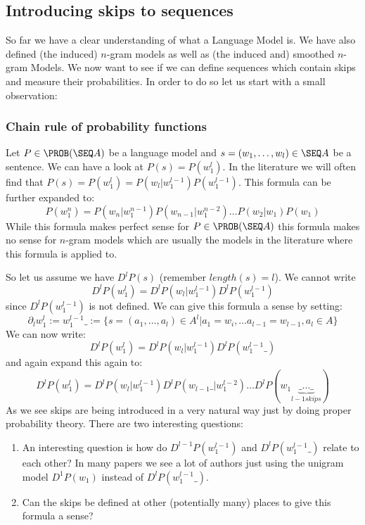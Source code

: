 \documentclass[11pt]{article}
\begin{document}
\subsection{Introducing skips to sequences}
So far we have a clear understanding of what a Language Model is. 
We have also defined (the induced) $n$-gram models as well as (the induced and) smoothed $n$-gram Models. 
We now want to see if we can define sequences which contain skips and measure their probabilities. In order to do so let us start with a small observation:

\subsubsection{Chain rule of probability functions}
Let $P\in \PROB(\SEQ A)$ be a language model and $s=(w_1,\dots,w_l)\in \SEQ A$ be a sentence.
We can have a look at $P(s) = P(w_1^l)$. 
In the literature \cite{CHENGOODMAN:1999} we will often find that $P(s)=P(w_1^l)=P(w_l|w_1^{l-1})P(w_1^{l-1})$.
This formula can be further expanded to:
\[P(w_1^n)=P(w_n|w_1^{n-1})P(w_{n-1}|w_1^{n-2})\dots P(w_2|w_1)P(w_1)\]
While this formula makes perfect sense for $P\in\PROB(\SEQ A)$ this formula makes no sense for $n$-gram models which are usually the models in the literature where this formula is applied to. 

So let us assume we have $D^lP(s)$ (remember $length(s)=l$). 
We cannot write 
\[D^lP(w_1^l) = D^lP(w_l|w_1^{l-1})D^lP(w_1^{l-1})\]
since $D^lP(w_1^{l-1})$ is not defined.
We can give this formula a sense by setting:
\[\partial_{l}w_1^{l} := w_1^{l-1}\_:=\{s=(a_1,\dots,a_l)\in A^l | a_1=w_i,\dots a_{l-1}=w_{l-1}, a_l \in A \}\]
We can now write:
\[D^lP(w_1^l) = D^lP(w_l|w_1^{l-1})D^lP(w_1^{l-1}\_)\]
and again expand this again to:
\[D^lP(w_1^l) = D^lP(w_l|w_1^{l-1})D^lP(w_{l-1}\_|w_1^{l-2})\dots D^lP(w_1\underbrace{\_\dots\_}_{l-1 skips})\]
As we see skips are being introduced in a very natural way just by doing proper probability theory.
There are two interesting questions:
\begin{enumerate}
\item An interesting question is how do $D^{l-1}P(w_1^{l-1})$ and $D^lP(w_1^{l-1}\_)$ relate to each other? In many papers we see a lot of authors just using the unigram model $D^1P(w_1)$ instead of $D^lP(w_1^{l-1}\_)$.
\item Can the skips be defined at other (potentially many) places to give this formula a sense?
\end{enumerate}
\end{document}
